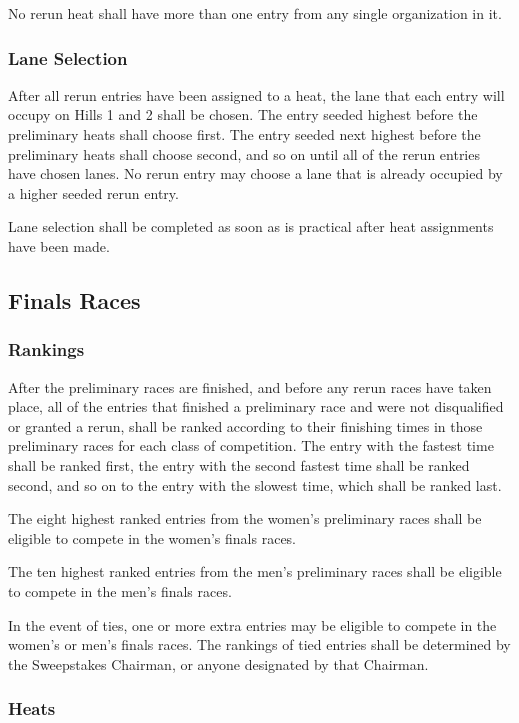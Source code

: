 	No rerun heat shall have more than one entry from any single organization in it.

\subsubsection{Lane Selection}

	After all rerun entries have been assigned to a heat, the lane that each entry will occupy on Hills 1 and 2 shall be chosen. The entry seeded highest before the preliminary heats shall choose first. The entry seeded next highest before the preliminary heats shall choose second, and so on until all of the rerun entries have chosen lanes. No rerun entry may choose a lane that is already occupied by a higher seeded rerun entry.

	Lane selection shall be completed as soon as is practical after heat assignments have been made.

\subsection{Finals Races}

\subsubsection{Rankings}

	After the preliminary races are finished, and before any rerun races have taken place, all of the entries that finished a preliminary race and were not disqualified or granted a rerun, shall be ranked according to their finishing times in those preliminary races for each class of competition. The entry with the fastest time shall be ranked first, the entry with the second fastest time shall be ranked second, and so on to the entry with the slowest time, which shall be ranked last.

	The eight highest ranked entries from the women's preliminary races shall be eligible to compete in the women's finals races.

	The ten highest ranked entries from the men's preliminary races shall be eligible to compete in the men's finals races.

	In the event of ties, one or more extra entries may be eligible to compete in the women's or men's finals races. The rankings of tied entries shall be determined by the Sweepstakes Chairman, or anyone designated by that Chairman.

\subsubsection{Heats}

